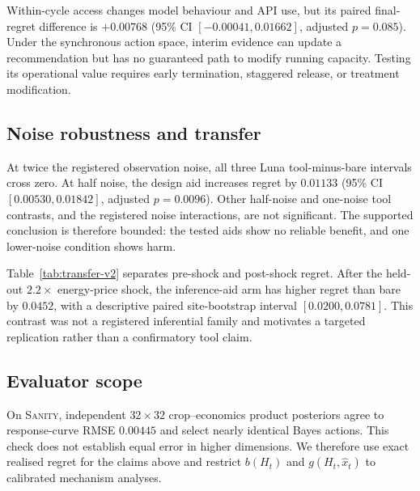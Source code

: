 

Within-cycle access changes model behaviour and API use, but its paired final-regret
difference is $+0.00768$ (95\% CI $[-0.00041,0.01662]$, adjusted $p=0.085$). Under the
synchronous action space, interim evidence can update a recommendation but has no guaranteed
path to modify running capacity. Testing its operational value requires early termination,
staggered release, or treatment modification.

\subsection{Noise robustness and transfer}
At twice the registered observation noise, all three Luna tool-minus-bare intervals cross
zero. At half noise, the design aid increases regret by $0.01133$ (95\% CI
$[0.00530,0.01842]$, adjusted $p=0.0096$). Other half-noise and one-noise tool contrasts,
and the registered noise interactions, are not significant. The supported conclusion is
therefore bounded: the tested aids show no reliable benefit, and one lower-noise condition
shows harm.



Table~\ref{tab:transfer-v2} separates pre-shock and post-shock regret. After the held-out $2.2\times$ energy-price shock, the inference-aid arm has higher regret
than bare by $0.0452$, with a descriptive paired site-bootstrap interval
$[0.0200,0.0781]$. This contrast was not a registered inferential family and motivates a
targeted replication rather than a confirmatory tool claim.

\subsection{Evaluator scope}
On \textsc{Sanity}, independent $32\times32$ crop--economics product posteriors agree to
response-curve RMSE $0.00445$ and select nearly identical Bayes actions. This check does not
establish equal error in higher dimensions. We therefore use exact realised regret for the
claims above and restrict $b(H_t)$ and $g(H_t,\hat x_t)$ to calibrated mechanism analyses.

